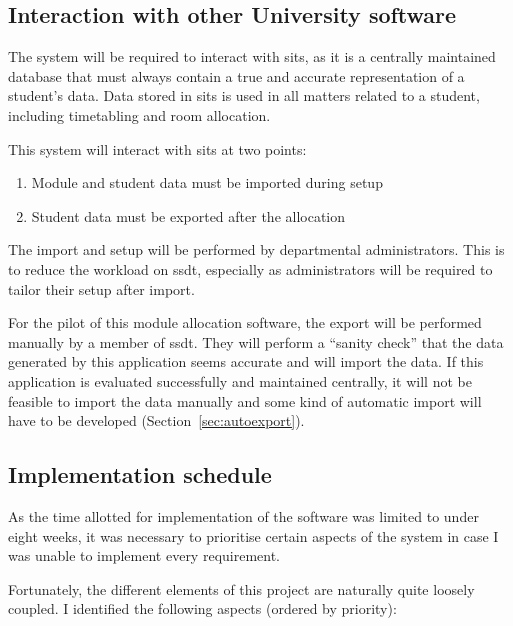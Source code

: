 \documentclass[draft]{scrartcl}
\begin{document}
\subsection{Interaction with other University software}

The system will be required to interact with \gls{sits}, as it is a centrally
maintained database that must always contain a true and accurate
representation of a student's data. Data stored in \gls{sits} is used in all
matters related to a student, including timetabling and room allocation.

This system will interact with \gls{sits} at two points:

\begin{enumerate}
  \item Module and student data must be imported during setup
  \item Student data must be exported after the allocation
\end{enumerate}

The import and setup will be performed by departmental administrators. This is
to reduce the workload on \gls{ssdt}, especially as administrators will be
required to tailor their setup after import.

For the pilot of this module allocation software, the export will be performed
manually by a member of \gls{ssdt}. They will perform a ``sanity check'' that
the data generated by this application seems accurate and will import the
data. If this application is evaluated successfully and maintained centrally,
it will not be feasible to import the data manually and some kind of automatic
import will have to be developed (Section~\ref{sec:autoexport}).




\subsection{Implementation schedule}

As the time allotted for implementation of the software was limited to under
eight weeks, it was necessary to prioritise certain aspects of the system in
case I was unable to implement every requirement.

Fortunately, the different elements of this project are naturally quite
loosely coupled. I identified the following aspects (ordered by priority):
\end{document}
